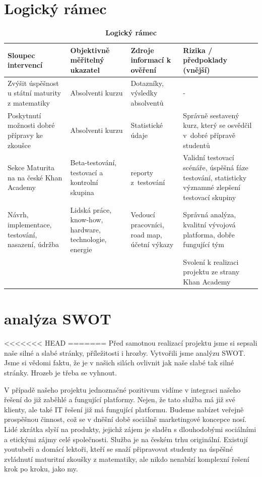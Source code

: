 \documentclass[12pt, a4paper]{report}
\begin{document}
\chapter{Logický rámec}
\label{sec:org7f8850c}

\begin{table}[htbp]
\caption{\textbf{Logický rámec}}
\centering
\begin{tabularx}{\textwidth}{XXXX}
Sloupec intervencí & Objektivně měřitelný ukazatel & Zdroje informací k ověření & Rizika / předpoklady (vnější)\\
\hline
Zvýšit úspěšnost u státní maturity z matematiky & Absolventi kurzu & Dotazníky, výsledky absolventů & -\\
\hline
Poskytnutí možnosti dobré přípravy ke zkoušce & Absolventi kurzu & Statistické údaje & Správně sestavený kurz, který se osvědčil v dobré přípravě studentů\\
\hline
Sekce Maturita na na české Khan Academy & Beta-testování, testovací a  kontrolní skupina & reporty z testování & Validní testovací scénáře, úspěšná fáze testování, statisticky významné zlepšení testovací skupiny\\
\hline
Návrh, implementace, testování, nasazení, údržba & Lidská práce, know-how, hardware, technologie, energie & Vedoucí pracovníci, road map, účetní výkazy & Správná analýza, kvalitní vývojová platforma, dobře fungující tým\\
\hline
 &  &  & Svolení k realizaci projektu ze strany Khan Academy\\
\end{tabularx}
\end{table}

\chapter{analýza SWOT}
<<<<<<< HEAD
\label{sec:org3e7dd03}
=======
Před samotnou realizací projektu jsme si sepsali naše silné a slabé stránky, příležitosti i hrozby. Vytvořili jsme analýzu SWOT. Jsme si vědomi faktu, že je v našich silách ovlivnit jak naše slabé tak silné stránky. Hrozeb je třeba se vyhnout.

V případě našeho projektu jednoznačné pozitivum vidíme v integraci našeho řešení do již zaběhlé a fungující platformy. Nejen, že tato služba má již své klienty, ale také IT řešení již má fungující platformu. Budeme nabízet veřejně prospěšnou činnost, což se v dněšní době sociálně marketingové koncepce nosí. Lidé zkrátka slyší na produkty, jejichž zájem je sladěn s dlouhodobými sociálními a etickými zájmy celé společnosti. Služba je na českém trhu originální. Existují youtubeři a domácí lektoři, kteří se snaží připravovat studenty na úspěšné zvládnutí maturitní zkoušky z matematiky, ale nikdo nenabízí komplexní řešení krok po kroku, jako my.
\end{document}
